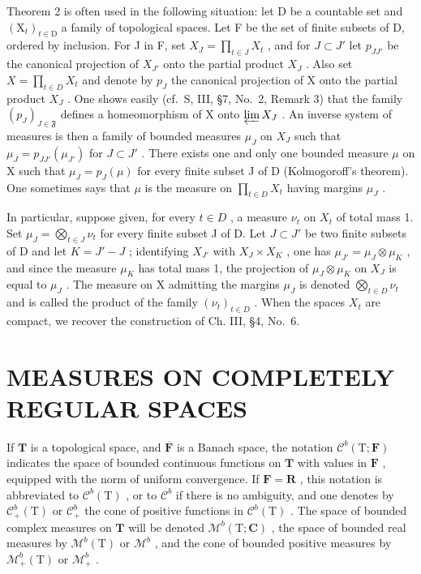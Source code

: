 Theorem 2 is often used in the following situation: let D be a countable set and \((\mathrm{X}_{t})_{t\in\mathrm{D}}\) a family of topological spaces. Let F be the set of finite subsets of D, ordered by inclusion. For J in F, set \(X_{J}=\prod_{t\in J}X_{t}\) , and for \(J\subset J'\) let \(p_{JJ'}\) be the canonical projection of \(X_{J'}\) onto the partial product \(X_{J}\) . Also set \(X=\prod_{t\in D}X_{t}\) and denote by \(p_{J}\) the canonical projection of X onto the partial product \(X_{J}\) . One shows easily (cf.~S, III, §7, No.~2, Remark 3) that the family \((p_{J})_{J\in\mathfrak{F}}\) defines a homeomorphism of X onto \(\varprojlim X_{J}\) . An inverse system of measures is then a family of bounded measures \(\mu_{J}\) on \(X_{J}\) such that \(\mu_{J}=p_{JJ'}(\mu_{J'})\) for \(J\subset J'\) . There exists one and only one bounded measure \(\mu\) on X such that \(\mu_{J}=p_{J}(\mu)\) for every finite subset J of D (Kolmogoroff's theorem). One sometimes says that \(\mu\) is the measure on \(\prod_{t\in D}X_{t}\) having margins \(\mu_{J}\) .

In particular, suppose given, for every \(t \in D\) , a measure \(\nu_{t}\) on \(X_{t}\) of total mass 1. Set \(\mu_{J} = \bigotimes_{t \in J} \nu_{t}\) for every finite subset J of D. Let \(J \subset J'\) be two finite subsets of D and let \(K = J' - J\) ; identifying \(X_{J'}\) with \(X_{J} \times X_{K}\) , one has \(\mu_{J'} = \mu_{J} \otimes \mu_{K}\) , and since the measure \(\mu_{K}\) has total mass 1, the projection of \(\mu_{J} \otimes \mu_{K}\) on \(X_{J}\) is equal to \(\mu_{J}\) . The measure on X admitting the margins \(\mu_{J}\) is denoted \(\bigotimes_{t \in D} \nu_{t}\) and is called the product of the family \((\nu_{t})_{t \in D}\) . When the spaces \(X_{t}\) are compact, we recover the construction of Ch. III, §4, No.~6.

\section{MEASURES ON COMPLETELY REGULAR SPACES}

If \(\mathbf{T}\) is a topological space, and \(\overline{\mathbf{F}}\) is a Banach space, the notation \(\mathcal{C}^b (\mathrm{T};\mathbf{F})\) indicates the space of bounded continuous functions on \(\mathbf{T}\) with values in \(\mathbf{F}\) , equipped with the norm of uniform convergence. If \(\mathbf{F} = \mathbf{R}\) , this notation is abbreviated to \(\mathcal{C}^b (\mathrm{T})\) , or to \(\mathcal{C}^b\) if there is no ambiguity, and one denotes by \(\mathcal{C}_+^b (\mathrm{T})\) or \(\mathcal{C}_+^b\) the cone of positive functions in \(\mathcal{C}^b (\mathrm{T})\) . The space of bounded complex measures on \(\mathbf{T}\) will be denoted \(\mathcal{M}^b (\mathrm{T};\mathbf{C})\) , the space of bounded real measures by \(\mathcal{M}^b (\mathrm{T})\) or \(\mathcal{M}^b\) , and the cone of bounded positive measures by \(\mathcal{M}_+^b (\mathrm{T})\) or \(\mathcal{M}_+^b\) .

